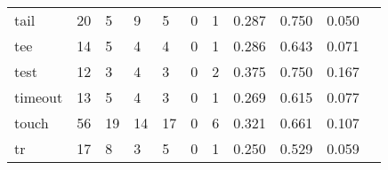 \begin{longtable}{lp{1.20cm}p{1.20cm}p{1.20cm}p{1.20cm}p{1.20cm}p{1.20cm}p{1.20cm}p{1.20cm}p{1.20cm}p{1.20cm}}
tail      &                                    20 &                                                  5 &                                                  9 &                                                  5 &                                                  0 &                                                  1 &                                         0.287 &                                              0.750 &                                              0.050 \\
tee       &                                    14 &                                                  5 &                                                  4 &                                                  4 &                                                  0 &                                                  1 &                                         0.286 &                                              0.643 &                                              0.071 \\
test      &                                    12 &                                                  3 &                                                  4 &                                                  3 &                                                  0 &                                                  2 &                                         0.375 &                                              0.750 &                                              0.167 \\
timeout   &                                    13 &                                                  5 &                                                  4 &                                                  3 &                                                  0 &                                                  1 &                                         0.269 &                                              0.615 &                                              0.077 \\
touch     &                                    56 &                                                 19 &                                                 14 &                                                 17 &                                                  0 &                                                  6 &                                         0.321 &                                              0.661 &                                              0.107 \\
tr        &                                    17 &                                                  8 &                                                  3 &                                                  5 &                                                  0 &                                                  1 &                                         0.250 &                                              0.529 &                                              0.059 \\

\end{longtable}
